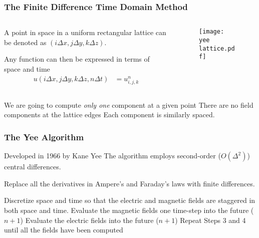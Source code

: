 \documentclass[10pt]{beamer}
\begin{document}
\begin{frame}
    \frametitle{The Finite Difference Time Domain Method}
    \begin{columns}[T] %
        \begin{column}{.6\textwidth}
            A point in space in a uniform rectangular lattice can be denoted as $(i\Delta x,j\Delta y,k \Delta z)$.

            Any function can then be expressed in terms of space and time
            \begin{align*}
                u(i\Delta x,j\Delta y,k \Delta z, n \Delta t) & = u_{i,j,k}^n
            \end{align*}
        \end{column}
        \begin{column}{.4\textwidth}
            \begin{figure}[T!]
                \centering
                \texttt{[image: yee lattice.pdf]}
            \end{figure}
        \end{column}%
    \end{columns}
    \begin{outline}
        \1 We are going to compute \textit{only one} component at a given point
        \1 There are no field components at the lattice edges
        \1 Each component is similarly spaced.
    \end{outline}
\end{frame}


\begin{frame}
    \frametitle{The Yee Algorithm}
    \begin{outline}
        \1 Developed in 1966 by Kane Yee
        \1 The algorithm employs second-order ($O(\Delta^2)$) central differences.
    \end{outline}
    \begin{outline}[enumerate]
        \1 Replace all the derivatives in Ampere’s and Faraday’s laws with finite differences.

        \2 Discretize space and time so that the electric and magnetic fields are staggered in both space and time.
        \1 Evaluate the magnetic fields one time-step into the future ($n+1$)
        \1 Evaluate the electric fields into the future ($n +  1$)
        \1 Repeat Steps 3 and 4 until all the fields have been computed
    \end{outline}
\end{frame}
\end{document}
